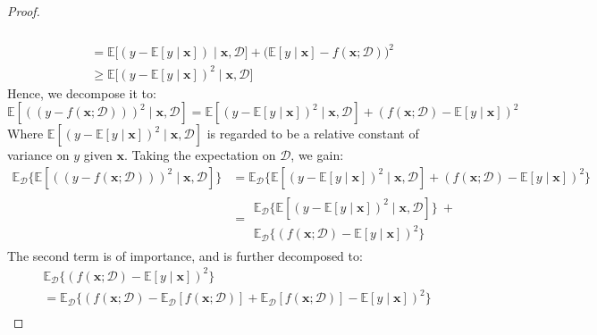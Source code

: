 \documentclass[10pt]{article} %
\begin{document}
\begin{proof}
\begin{equation}
\begin{split}
\begin{multlined}
            \end{multlined} \\
            & = \mathbb{E} \Big[(y-\mathbb{E}[y\mid \mathbf{x}])\mid \mathbf{x},\mathcal{D}\Big] + \big(\mathbb{E}[y\mid \mathbf{x}]-f(\mathbf{x};\mathcal{D})\big)^{2}\\
            & \geq \mathbb{E} \big[(y-\mathbb{E}[y\mid \mathbf{x}])^{2}\mid \mathbf{x},\mathcal{D}\big]
        \end{split}
    \end{equation}
    Hence, we decompose it to: 
    \begin{equation}
        \mathbb{E} \left[((y-f(\mathbf{x};\mathcal{D})))^{2}\mid \mathbf{x}, \mathcal{D}\right] = \mathbb{E}\left[(y-\mathbb{E}[y\mid \mathbf{x}])^{2}\mid \mathbf{x},\mathcal{D}\right] + (f(\mathbf{x};\mathcal{D})-\mathbb{E}[y\mid \mathbf{x}])^{2}
    \end{equation}
    Where $\mathbb{E}\left[(y-\mathbb{E}[y\mid \mathbf{x}])^{2}\mid \mathbf{x},\mathcal{D}\right]$ is regarded to be a relative constant of variance on $y$ given $\mathbf{x}$. Taking the expectation on $\mathcal{D}$, we gain: 
    \begin{equation}
        \begin{split}
            \mathbb{E}_{\mathcal{D}} \Big\{ \mathbb{E} \left[((y-f(\mathbf{x};\mathcal{D})))^{2}\mid \mathbf{x}, \mathcal{D}\right]\Big\} & = \mathbb{E}_{\mathcal{D}} \Big\{\mathbb{E}\left[(y-\mathbb{E}[y\mid \mathbf{x}])^{2}\mid \mathbf{x},\mathcal{D}\right] + (f(\mathbf{x};\mathcal{D})-\mathbb{E}[y\mid \mathbf{x}])^{2}\Big\}\\
            & = \begin{multlined}
                \mathbb{E}_{\mathcal{D}} \Big\{ \mathbb{E}\left[(y-\mathbb{E}[y\mid \mathbf{x}])^{2}\mid \mathbf{x},\mathcal{D}\right]\Big\} \: + \\ \mathbb{E}_{\mathcal{D}} \Big\{ (f(\mathbf{x};\mathcal{D})-\mathbb{E}[y\mid \mathbf{x}])^{2}\Big\}
            \end{multlined}
        \end{split}
    \end{equation}
    The second term is of importance, and is further decomposed to: 
    \begin{equation}
        \begin{split}
            & \mathbb{E}_{\mathcal{D}} \Big\{ (f(\mathbf{x};\mathcal{D})-\mathbb{E}[y\mid \mathbf{x}])^{2}\Big\} \\ 
            & = \mathbb{E}_{\mathcal{D}} \Big\{ (f(\mathbf{x};\mathcal{D})- \mathbb{E}_{\mathcal{D}}[f(\mathbf{x};\mathcal{D})] + \mathbb{E}_{\mathcal{D}}[f(\mathbf{x};\mathcal{D})] -\mathbb{E}[y\mid \mathbf{x}])^{2}\Big\} \\

\end{split}
\end{equation}
\end{proof}
\end{document}
